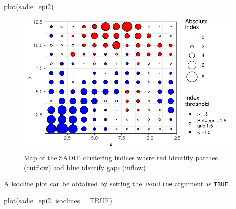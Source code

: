 \documentclass[
  letterpaper,
  DIV=11,
  numbers=noendperiod]{scrreprt}
\newenvironment{Shaded}{\begin{snugshade}}{\end{snugshade}}
\newcommand{\AttributeTok}[1]{\textcolor[rgb]{0.40,0.45,0.13}{#1}}
\newcommand{\ConstantTok}[1]{\textcolor[rgb]{0.56,0.35,0.01}{#1}}
\newcommand{\FunctionTok}[1]{\textcolor[rgb]{0.28,0.35,0.67}{#1}}
\newcommand{\NormalTok}[1]{\textcolor[rgb]{0.00,0.23,0.31}{#1}}
\begin{document}
\begin{Shaded}
\begin{Highlighting}[]
\FunctionTok{plot}\NormalTok{(sadie\_epi2)}
\end{Highlighting}
\end{Shaded}

\begin{figure}[H]

{\centering \includegraphics{spatial-tests_files/figure-pdf/fig-sadie1-1.pdf}

}

\caption{\label{fig-sadie1}Map of the SADIE clustering indices where red
identifiy patches (outflow) and blue identify gaps (inflow)}

\end{figure}

A isocline plot can be obtained by setting the \texttt{isocline}
argument as \texttt{TRUE}.

\begin{Shaded}
\begin{Highlighting}[]
\FunctionTok{plot}\NormalTok{(sadie\_epi2, }\AttributeTok{isoclines =} \ConstantTok{TRUE}\NormalTok{)}
\end{Highlighting}
\end{Shaded}
\end{document}
